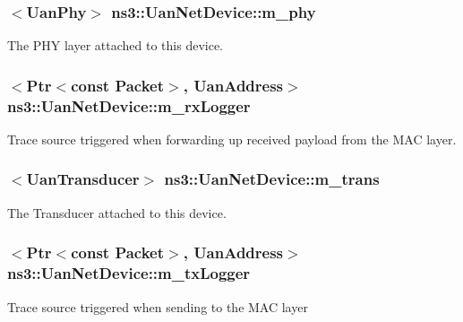 \subsubsection[{\texorpdfstring{m\+\_\+phy}{m_phy}}]{$<${\bf Uan\+Phy}$>$ ns3\+::\+Uan\+Net\+Device\+::m\+\_\+phy\hspace{0.3cm}{\ttfamily [private]}}\hypertarget{classns3_1_1UanNetDevice_a844d7ac9f29552eebf86d2f7cbf3c39c}{}\label{classns3_1_1UanNetDevice_a844d7ac9f29552eebf86d2f7cbf3c39c}


The P\+HY layer attached to this device. 

\subsubsection[{\texorpdfstring{m\+\_\+rx\+Logger}{m_rxLogger}}]{$<${\bf Ptr}$<$const {\bf Packet}$>$, {\bf Uan\+Address}$>$ ns3\+::\+Uan\+Net\+Device\+::m\+\_\+rx\+Logger\hspace{0.3cm}{\ttfamily [private]}}\hypertarget{classns3_1_1UanNetDevice_a427c15bb70e38facb1c50fe76bfe1979}{}\label{classns3_1_1UanNetDevice_a427c15bb70e38facb1c50fe76bfe1979}
Trace source triggered when forwarding up received payload from the M\+AC layer. 
\subsubsection[{\texorpdfstring{m\+\_\+trans}{m_trans}}]{$<${\bf Uan\+Transducer}$>$ ns3\+::\+Uan\+Net\+Device\+::m\+\_\+trans\hspace{0.3cm}{\ttfamily [private]}}\hypertarget{classns3_1_1UanNetDevice_a9576fcd3b2e1f07fbb0c7125f905f0e0}{}\label{classns3_1_1UanNetDevice_a9576fcd3b2e1f07fbb0c7125f905f0e0}


The Transducer attached to this device. 

\subsubsection[{\texorpdfstring{m\+\_\+tx\+Logger}{m_txLogger}}]{$<${\bf Ptr}$<$const {\bf Packet}$>$, {\bf Uan\+Address}$>$ ns3\+::\+Uan\+Net\+Device\+::m\+\_\+tx\+Logger\hspace{0.3cm}{\ttfamily [private]}}\hypertarget{classns3_1_1UanNetDevice_ab1ed35043886ee497c4ea96267c50b79}{}\label{classns3_1_1UanNetDevice_ab1ed35043886ee497c4ea96267c50b79}
Trace source triggered when sending to the M\+AC layer 

